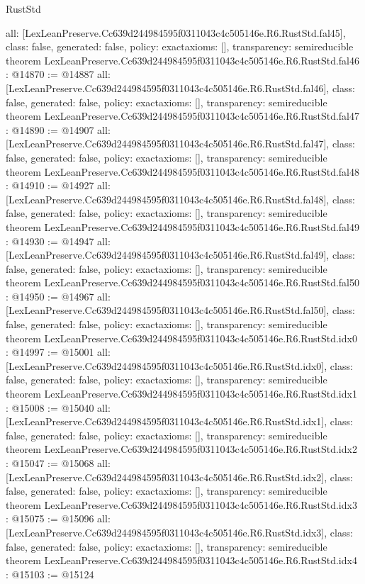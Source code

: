 \begin{lexlean}{RustStd}
\begin{coremodule}
{  all: [LexLeanPreserve.Cc639d244984595f0311043c4c505146e.R6.RustStd.fal45],
  class: false,
  generated: false,
  policy: exact{axioms: []},
  transparency: semireducible
}
theorem LexLeanPreserve.Cc639d244984595f0311043c4c505146e.R6.RustStd.fal46 : @14870 := @14887 {
  all: [LexLeanPreserve.Cc639d244984595f0311043c4c505146e.R6.RustStd.fal46],
  class: false,
  generated: false,
  policy: exact{axioms: []},
  transparency: semireducible
}
theorem LexLeanPreserve.Cc639d244984595f0311043c4c505146e.R6.RustStd.fal47 : @14890 := @14907 {
  all: [LexLeanPreserve.Cc639d244984595f0311043c4c505146e.R6.RustStd.fal47],
  class: false,
  generated: false,
  policy: exact{axioms: []},
  transparency: semireducible
}
theorem LexLeanPreserve.Cc639d244984595f0311043c4c505146e.R6.RustStd.fal48 : @14910 := @14927 {
  all: [LexLeanPreserve.Cc639d244984595f0311043c4c505146e.R6.RustStd.fal48],
  class: false,
  generated: false,
  policy: exact{axioms: []},
  transparency: semireducible
}
theorem LexLeanPreserve.Cc639d244984595f0311043c4c505146e.R6.RustStd.fal49 : @14930 := @14947 {
  all: [LexLeanPreserve.Cc639d244984595f0311043c4c505146e.R6.RustStd.fal49],
  class: false,
  generated: false,
  policy: exact{axioms: []},
  transparency: semireducible
}
theorem LexLeanPreserve.Cc639d244984595f0311043c4c505146e.R6.RustStd.fal50 : @14950 := @14967 {
  all: [LexLeanPreserve.Cc639d244984595f0311043c4c505146e.R6.RustStd.fal50],
  class: false,
  generated: false,
  policy: exact{axioms: []},
  transparency: semireducible
}
theorem LexLeanPreserve.Cc639d244984595f0311043c4c505146e.R6.RustStd.idx0 : @14997 := @15001 {
  all: [LexLeanPreserve.Cc639d244984595f0311043c4c505146e.R6.RustStd.idx0],
  class: false,
  generated: false,
  policy: exact{axioms: []},
  transparency: semireducible
}
theorem LexLeanPreserve.Cc639d244984595f0311043c4c505146e.R6.RustStd.idx1 : @15008 := @15040 {
  all: [LexLeanPreserve.Cc639d244984595f0311043c4c505146e.R6.RustStd.idx1],
  class: false,
  generated: false,
  policy: exact{axioms: []},
  transparency: semireducible
}
theorem LexLeanPreserve.Cc639d244984595f0311043c4c505146e.R6.RustStd.idx2 : @15047 := @15068 {
  all: [LexLeanPreserve.Cc639d244984595f0311043c4c505146e.R6.RustStd.idx2],
  class: false,
  generated: false,
  policy: exact{axioms: []},
  transparency: semireducible
}
theorem LexLeanPreserve.Cc639d244984595f0311043c4c505146e.R6.RustStd.idx3 : @15075 := @15096 {
  all: [LexLeanPreserve.Cc639d244984595f0311043c4c505146e.R6.RustStd.idx3],
  class: false,
  generated: false,
  policy: exact{axioms: []},
  transparency: semireducible
}
theorem LexLeanPreserve.Cc639d244984595f0311043c4c505146e.R6.RustStd.idx4 : @15103 := @15124 {
}
\end{coremodule}
\end{lexlean}
